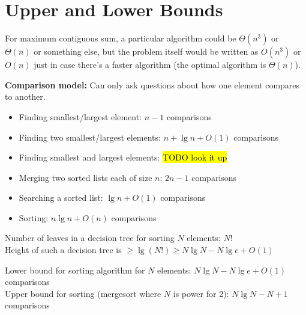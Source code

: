 \section{Upper and Lower Bounds}

For maximum contiguous sum, a particular algorithm could be $\Theta(n^3)$ or $\Theta(n)$ or something else, but the problem itself would be written as $O(n^3)$ or $O(n)$ just in case there's a faster algorithm (the optimal algorithm is $\Theta(n)$).

\textbf{Comparison model:} Can only ask questions about how one element compares to another.

\begin{itemize}
    \item Finding smallest/largest element: $n - 1$ comparisons
    \item Finding two smallest/largest elements: $n + \lg n + O(1)$ comparisons
    \item Finding smallest and largest elements: \hl{TODO look it up}
    \item Merging two sorted lists each of size $n$: $2n - 1$ comparisons
    \item Searching a sorted list: $\lg n + O(1)$ comparisons
    \item Sorting: $n \lg n + O(n)$ comparisons
\end{itemize}

Number of leaves in a decision tree for sorting $N$ elements: $N!$\\
Height of such a decision tree is $\geq \lg(N!) \geq N \lg N - N\lg e + O(1)$

Lower bound for sorting algorithm for $N$ elements: $N \lg N - N\lg e + O(1)$ comparisons\\
Upper bound for sorting (mergesort where $N$ is power for 2): $N\lg N - N + 1$ comparisons
